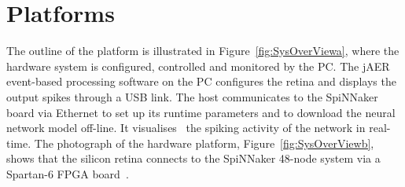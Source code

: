 


\section{Platforms}
\label{sec:plt}
The outline of the platform is illustrated in Figure~\ref{fig:SysOverViewa}, where the hardware system is configured, controlled and monitored by the PC.
The jAER~\cite{delbruck2008frame} event-based processing software on the PC configures the retina and displays the output spikes through a USB link.
The host communicates to the SpiNNaker board via Ethernet to set up its runtime parameters and to download the neural network model off-line.
It visualises~\cite{6252490} the spiking activity of the network in real-time.
The photograph of the hardware platform, Figure~\ref{fig:SysOverViewb}, shows that the silicon retina connects to the SpiNNaker 48-node system via a Spartan-6 FPGA board~\cite{galluppi2012real}.


